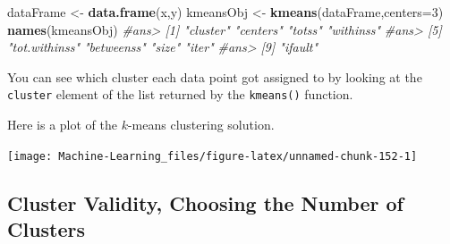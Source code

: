 \documentclass[]{book}
\newenvironment{Shaded}{\begin{snugshade}}{\end{snugshade}}
\newcommand{\KeywordTok}[1]{\textcolor[rgb]{0.13,0.29,0.53}{\textbf{#1}}}
\newcommand{\DataTypeTok}[1]{\textcolor[rgb]{0.13,0.29,0.53}{#1}}
\newcommand{\DecValTok}[1]{\textcolor[rgb]{0.00,0.00,0.81}{#1}}
\newcommand{\StringTok}[1]{\textcolor[rgb]{0.31,0.60,0.02}{#1}}
\newcommand{\CommentTok}[1]{\textcolor[rgb]{0.56,0.35,0.01}{\textit{#1}}}
\newcommand{\OperatorTok}[1]{\textcolor[rgb]{0.81,0.36,0.00}{\textbf{#1}}}
\newcommand{\NormalTok}[1]{#1}
\let\origfigure\figure
\let\endorigfigure\endfigure
\renewenvironment{figure}[1][2] {
    \expandafter\origfigure\expandafter[H]
} {
    \endorigfigure
}
\begin{document}
\begin{Shaded}
\begin{Highlighting}[]
\NormalTok{dataFrame <-}\StringTok{ }\KeywordTok{data.frame}\NormalTok{(x,y)}
\NormalTok{kmeansObj <-}\StringTok{ }\KeywordTok{kmeans}\NormalTok{(dataFrame,}\DataTypeTok{centers=}\DecValTok{3}\NormalTok{)}
\KeywordTok{names}\NormalTok{(kmeansObj)}
\CommentTok{#ans> [1] "cluster"      "centers"      "totss"        "withinss"    }
\CommentTok{#ans> [5] "tot.withinss" "betweenss"    "size"         "iter"        }
\CommentTok{#ans> [9] "ifault"}
\end{Highlighting}
\end{Shaded}

You can see which cluster each data point got assigned to by looking at
the \texttt{cluster} element of the list returned by the
\texttt{kmeans()} function.

\begin{Shaded}
\end{Shaded}

Here is a plot of the \(k\)-means clustering solution.

\begin{Shaded}
\end{Shaded}

\begin{figure}

{\centering \texttt{[image: Machine-Learning\_files/figure-latex/unnamed-chunk-152-1]} 

}

\caption{$k$-means clustering solution}\label{fig:unnamed-chunk-152}
\end{figure}

\subsection{Cluster Validity, Choosing the Number of
Clusters}\label{cluster-validity-choosing-the-number-of-clusters}
\end{document}

